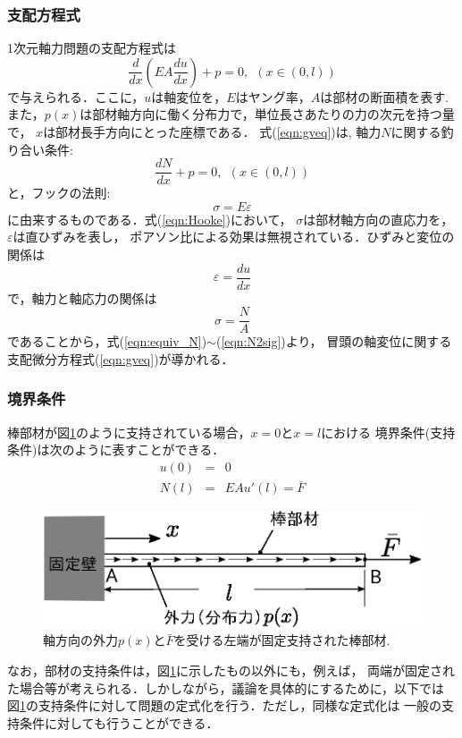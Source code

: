 \documentclass[10pt,a4j]{jarticle}
\begin{document}
\subsubsection{支配方程式}
1次元軸力問題の支配方程式は
\begin{equation}
	\frac{d}{dx}\left(EA \frac{du}{dx}\right) + p =0, \ \ \left(x\in (0,l)\right)
	\label{eqn:gveq}
\end{equation}
で与えられる．ここに，$u$は軸変位を，$E$はヤング率，$A$は部材の断面積を表す.
また，$p(x)$は部材軸方向に働く分布力で，単位長さあたりの力の次元を持つ量で，
$x$は部材長手方向にとった座標である．
式(\ref{eqn:gveq})は, 軸力$N$に関する釣り合い条件:
\begin{equation}
	\frac{dN}{dx}+p=0, \ \ \left(x\in (0,l)\right)
	\label{eqn:equiv_N}
\end{equation}
と，フックの法則:
\begin{equation}
	\sigma=E\varepsilon
	\label{eqn:Hooke}
\end{equation}
に由来するものである．式(\ref{eqn:Hooke})において，
$\sigma$は部材軸方向の直応力を，$\varepsilon$は直ひずみを表し，
ポアソン比による効果は無視されている．ひずみと変位の関係は
\begin{equation}
	\varepsilon = \frac{du}{dx}
	\label{eqn:dudx}
\end{equation}
で，軸力と軸応力の関係は
\begin{equation}
	\sigma=\frac{N}{A}
	\label{eqn:N2sig}
\end{equation}
であることから，式(\ref{eqn:equiv_N})$\sim$(\ref{eqn:N2sig})より，
冒頭の軸変位に関する支配微分方程式(\ref{eqn:gveq})が導かれる．
\subsubsection{境界条件}
棒部材が図\ref{fig:fig1_1}のように支持されている場合，$x=0$と$x=l$における
境界条件(支持条件)は次のように表すことができる．
\begin{eqnarray}
	u (0) &= & 0 
	\label{eqn:BC_u}
	\\
	N (l) &= & EA u'(l)=\bar F 
	\label{eqn:BC_N}
\end{eqnarray}
\begin{figure}[h]
	\begin{center}
	\includegraphics[width=0.4\linewidth]{fig1_1.eps} 
	\end{center}
	\caption{軸方向の外力$p(x)$と$\bar F$を受ける左端が固定支持された棒部材.} 
	\label{fig:fig1_1}
\end{figure}
なお，部材の支持条件は，図\ref{fig:fig1_1}に示したもの以外にも，例えば，
両端が固定された場合等が考えられる．しかしながら，議論を具体的にするために，以下では
図\ref{fig:fig1_1}の支持条件に対して問題の定式化を行う．ただし，同様な定式化は
一般の支持条件に対しても行うことができる．
\end{document}
